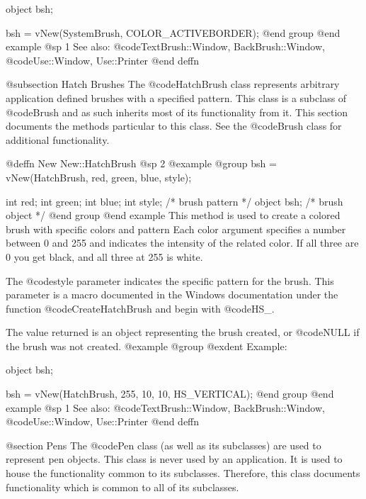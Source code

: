 object  bsh;

bsh = vNew(SystemBrush, COLOR_ACTIVEBORDER);
@end group
@end example
@sp 1
See also:  @code{TextBrush::Window, BackBrush::Window,}
        @code{Use::Window, Use::Printer}
@end deffn










@subsection Hatch Brushes
The @code{HatchBrush} class represents arbitrary application defined
brushes with a specified pattern.  This class is a subclass of
@code{Brush} and as such inherits most of its functionality from it.
This section documents the methods particular to this class.  See the
@code{Brush} class for additional functionality.






@deffn {New} New::HatchBrush
@sp 2
@example
@group
bsh = vNew(HatchBrush, red, green, blue, style);

int     red;
int     green;
int     blue;
int     style;  /*  brush pattern  */
object  bsh;    /*  brush object   */
@end group
@end example
This method is used to create a colored brush with specific colors and
pattern Each color argument specifies a number between 0 and 255 and
indicates the intensity of the related color.  If all three are 0 you
get black, and all three at 255 is white.

The @code{style} parameter indicates the specific pattern for the brush.
This parameter is a macro documented in the Windows documentation under
the function @code{CreateHatchBrush} and begin with @code{HS_}.

The value returned is an object representing the brush created, or
@code{NULL} if the brush was not created.
@example
@group
@exdent Example:

object  bsh;

bsh = vNew(HatchBrush, 255, 10, 10, HS_VERTICAL);
@end group
@end example
@sp 1
See also:  @code{TextBrush::Window, BackBrush::Window,}
        @code{Use::Window, Use::Printer}
@end deffn









@section Pens
The @code{Pen} class (as well as its subclasses) are used to represent
pen objects.  This class is never used by an application.  It is used
to house the functionality common to its subclasses.  Therefore, this
class documents functionality which is common to all of its subclasses.









